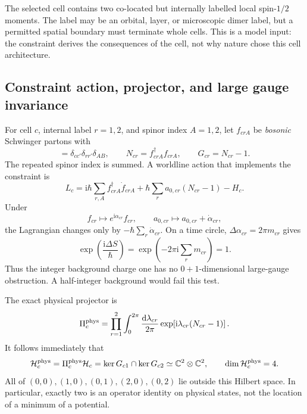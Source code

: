 \documentclass[11pt]{article}
\theoremstyle{definition}
\theoremstyle{remark}
\newcommand{\ii}{\mathrm i}
\newcommand{\dd}{\mathrm d}
\newcommand{\CC}{\mathbb C}
\newcommand{\cH}{\mathcal H}
\begin{document}
The selected cell contains two co-located but internally labelled local
spin-\(1/2\) moments.  The label may be an orbital, layer, or microscopic
dimer label, but a permitted spatial boundary must terminate whole cells.
This is a model input: the constraint derives the consequences of the cell,
not why nature chose this cell architecture.

\subsection{Constraint action, projector, and large gauge invariance}

For cell \(c\), internal label \(r=1,2\), and spinor index \(A=1,2\), let
\(f_{crA}\) be \emph{bosonic} Schwinger partons with
\begin{equation}
 [f_{crA},f_{c'r'B}^\dagger]
 =\delta_{cc'}\delta_{rr'}\delta_{AB},\qquad
 N_{cr}=f_{crA}^\dagger f_{crA},\qquad
 G_{cr}=N_{cr}-1.
 \label{eq:gauss-law}
\end{equation}
The repeated spinor index is summed.  A worldline action that implements the
constraint is
\begin{equation}
 L_c=\ii\hbar\sum_{r,A}f_{crA}^\dagger\dot f_{crA}
 +\hbar\sum_r a_{0,cr}(N_{cr}-1)-H_c.
 \label{eq:constraint-action}
\end{equation}
Under
\begin{equation}
 f_{cr}\longmapsto e^{\ii\alpha_{cr}}f_{cr},\qquad
 a_{0,cr}\longmapsto a_{0,cr}+\dot\alpha_{cr},
 \label{eq:constraint-gauge}
\end{equation}
the Lagrangian changes only by
\(-\hbar\sum_r\dot\alpha_{cr}\).  On a time circle,
\(\Delta\alpha_{cr}=2\pi m_{cr}\) gives
\begin{equation}
 \exp\left(\frac{\ii\Delta S}{\hbar}\right)
 =\exp\left(-2\pi\ii\sum_r m_{cr}\right)=1.
 \label{eq:large-gauge}
\end{equation}
Thus the integer background charge one has no \(0+1\)-dimensional large-gauge
obstruction.  A half-integer background would fail this test.

The exact physical projector is
\begin{equation}
 \Pi_c^{\rm phys}=\prod_{r=1}^2\int_0^{2\pi}
 \frac{\dd\lambda_{cr}}{2\pi}
 \exp\!\left[\ii\lambda_{cr}(N_{cr}-1)\right].
 \label{eq:exact-projector}
\end{equation}
It follows immediately that
\begin{equation}
 \cH_c^{\rm phys}=\Pi_c^{\rm phys}\cH_c
 =\ker G_{c1}\cap\ker G_{c2}
 \simeq\CC^2\otimes\CC^2,
 \qquad \dim\cH_c^{\rm phys}=4.
 \label{eq:physical-cell}
\end{equation}
All of
\((0,0),(1,0),(0,1),(2,0),(0,2)\) lie outside this Hilbert space.  In
particular, exactly two is an operator identity on physical states,
not the location of a minimum of a potential.
\end{document}
